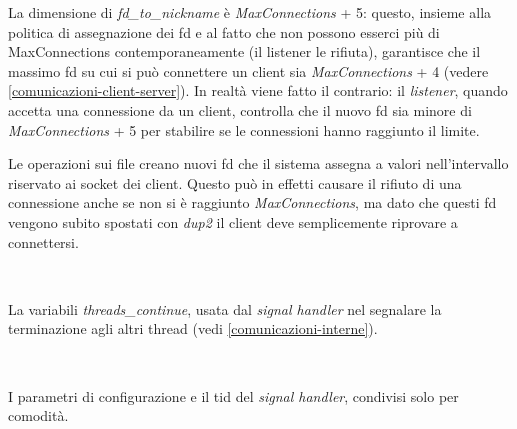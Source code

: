\documentclass[a4paper]{article}
\theoremstyle{theorem}
\theoremstyle{remark}
\theoremstyle{definition}
\theoremstyle{corollary}
\theoremstyle{lemma}
\newcommand\codeName[1]{%
	\textit{#1}}
\begin{document}
La dimensione di \codeName{fd\_to\_nickname} è \codeName{MaxConnections} + 5: questo, insieme alla politica di assegnazione dei fd e al fatto che non possono esserci più di MaxConnections contemporaneamente (il listener le rifiuta), garantisce che il massimo fd su cui si può connettere un client sia \codeName{MaxConnections} + 4 (vedere \autoref{comunicazioni-client-server}). In realtà viene fatto il contrario: il \codeName{listener}, quando accetta una connessione da un client, controlla che il nuovo fd sia minore di \codeName{MaxConnections} + 5 per stabilire se le connessioni hanno raggiunto il limite.

Le operazioni sui file creano nuovi fd che il sistema assegna a valori nell'intervallo riservato ai socket dei client. Questo può in effetti causare il rifiuto di una connessione anche se non si è raggiunto \codeName{MaxConnections}, ma dato che questi fd vengono subito spostati con \codeName{dup2} il client deve semplicemente riprovare a connettersi.

\

La variabili \codeName{threads\_continue}, usata dal \codeName{signal handler} nel segnalare la terminazione agli altri thread (vedi \autoref{comunicazioni-interne}).

\

I parametri di configurazione e il tid del \codeName{signal handler}, condivisi solo per comodità.
\end{document}
